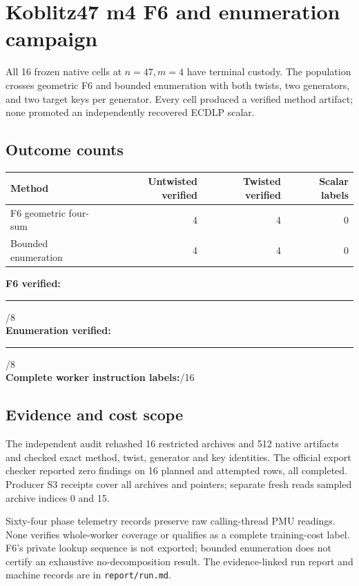 \documentclass[10pt]{article}
\begin{document}
\section*{Koblitz47 m4 F6 and enumeration campaign}
All 16 frozen native cells at $n=47,m=4$ have terminal custody. The population
crosses geometric F6 and bounded enumeration with both twists, two generators,
and two target keys per generator. Every cell produced a verified method
artifact; none promoted an independently recovered ECDLP scalar.

\subsection*{Outcome counts}
\noindent\begin{tabular}{lrrr}
Method & Untwisted verified & Twisted verified & Scalar labels\\\hline
F6 geometric four-sum & 4 & 4 & 0\\
Bounded enumeration & 4 & 4 & 0
\end{tabular}

\vspace{1em}\noindent\textbf{F6 verified:}\quad\rule{2in}{10pt}/8\\[8pt]
\textbf{Enumeration verified:}\quad\rule{2in}{10pt}/8\\[8pt]
\textbf{Complete worker instruction labels:}/16

\subsection*{Evidence and cost scope}
The independent audit rehashed 16 restricted archives and 512 native
artifacts and checked exact method, twist, generator and key identities. The
official export checker reported zero findings on 16 planned and attempted
rows, all completed. Producer S3 receipts cover all archives and pointers;
separate fresh reads sampled archive indices 0 and 15.

Sixty-four phase telemetry records preserve raw calling-thread PMU readings.
None verifies whole-worker coverage or qualifies as a complete training-cost
label. F6's private lookup sequence is not exported; bounded enumeration does
not certify an exhaustive no-decomposition result. The evidence-linked run
report and machine records are in \texttt{report/run.md}.
\end{document}

